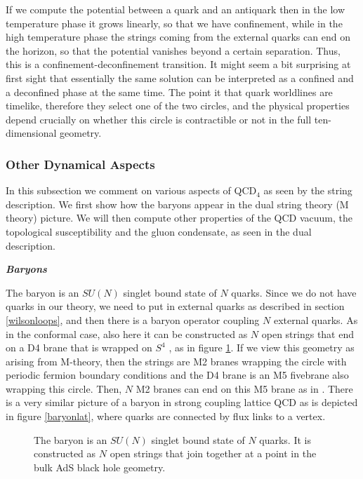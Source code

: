 If we compute the potential between a quark and an antiquark then
in the low temperature phase it grows linearly, so that we have 
confinement, while in the high temperature phase the strings
coming from the external quarks can end on the horizon, so that
the potential vanishes beyond a certain separation. Thus, this
is  a confinement-deconfinement transition. It might seem a bit
surprising at first sight that essentially the same solution can 
be interpreted as a confined and a deconfined phase at the same time. The 
point it that quark worldlines are timelike, therefore they select
one of the two circles, and the physical properties depend crucially 
on whether this circle
is contractible or not in the full ten-dimensional geometry. 


\subsubsection{Other Dynamical Aspects}
\label{other_dynamical}

In this subsection we comment 
on various aspects of QCD$_4$  as seen by the
string description. 
We first show  how the baryons appear in the dual string theory (M
theory) picture.
We will then compute other properties of the QCD vacuum, the topological
susceptibility and the gluon condensate, as seen in the dual description.

\medskip

{\it\bf Baryons}

The baryon is an $SU(N)$ singlet bound state of 
$N$ quarks. Since we do not have quarks in our theory, we need to put
in external quarks as described in section \ref{wilsonloops}, 
and then there is a
baryon operator coupling $N$ external quarks.
As in the conformal case, also here it can be constructed as $N$ 
open strings that end on a D4 brane that is wrapped on 
$S^4$ 
\cite{Gross:1998gk,Witten:1998xy}, 
as in figure \ref{baryon}.  
If we view this geometry as arising from M-theory, then the strings
are M2 branes wrapping the circle with periodic fermion 
boundary conditions
 and the D4 brane is an M5 fivebrane also wrapping 
this circle. Then, $N$ M2 branes can end on this M5 brane as in 
\cite{Witten:1998xy}.
%
%
There is a very similar picture of a baryon in strong coupling
lattice QCD as is depicted in 
figure \ref{baryonlat}, where quarks are connected by flux links to a vertex.
%
\begin{figure}[htb]
\begin{center}
\epsfxsize=2.8in\leavevmode{}
\end{center}
\caption{The baryon is an $SU(N)$ singlet bound state of 
$N$ quarks. It is constructed as $N$ open strings that join together
at a point in the bulk AdS black hole geometry.
}
\label{baryon}
\end{figure}

